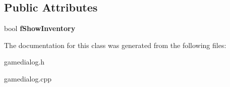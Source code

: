 \subsection*{\-Public \-Attributes}
\begin{DoxyCompactItemize}
\item 
\hypertarget{classgameDialog_a4ad8cad61bb9109745936ec02a29e4df}{bool {\bfseries f\-Show\-Inventory}}\label{classgameDialog_a4ad8cad61bb9109745936ec02a29e4df}

\end{DoxyCompactItemize}


\-The documentation for this class was generated from the following files\-:\begin{DoxyCompactItemize}
\item 
gamedialog.\-h\item 
gamedialog.\-cpp\end{DoxyCompactItemize}
